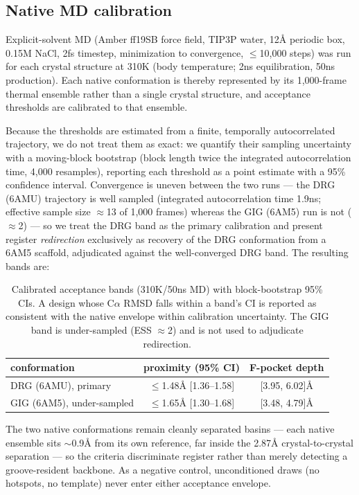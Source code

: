 \documentclass[letterpaper]{article}
\begin{document}
\subsection{Native MD calibration}

Explicit-solvent MD (Amber ff19SB force field, TIP3P water, 12\AA{} periodic box, 0.15M NaCl, 2fs
timestep, minimization to convergence, $\leq$10,000 steps) was run for each crystal structure at 310K
(body temperature; 2ns equilibration, 50ns production). Each native conformation is thereby represented by
its 1,000-frame thermal ensemble rather than a single crystal structure, and acceptance thresholds are
calibrated to that ensemble.

Because the thresholds are estimated from a finite, temporally autocorrelated trajectory, we do not treat
them as exact: we quantify their sampling uncertainty with a moving-block bootstrap (block length twice the
integrated autocorrelation time, 4{,}000 resamples), reporting each threshold as a point estimate with a
95\% confidence interval. Convergence is uneven between the two runs --- the DRG (6AMU) trajectory is well
sampled (integrated autocorrelation time 1.9ns; effective sample size $\approx$13 of 1{,}000 frames)
whereas the GIG (6AM5) run is not ($\approx$2) --- so we treat the DRG band as the primary calibration and
present register \emph{redirection} exclusively as recovery of the DRG conformation from a 6AM5 scaffold,
adjudicated against the well-converged DRG band. The resulting bands are:

\begin{table}[t]
\centering
\small
\begin{tabular}{lcc}
\toprule
conformation & proximity (95\% CI) & F-pocket depth \\
\midrule
DRG (6AMU), primary & $\leq$1.48\AA{} [1.36--1.58] & [3.95, 6.02]\AA{} \\
GIG (6AM5), under-sampled & $\leq$1.65\AA{} [1.30--1.68] & [3.48, 4.79]\AA{} \\
\bottomrule
\end{tabular}
\caption{Calibrated acceptance bands (310K/50ns MD) with block-bootstrap 95\% CIs. A design whose
C$\alpha$ RMSD falls within a band's CI is reported as consistent with the native envelope within
calibration uncertainty. The GIG band is under-sampled (ESS $\approx$2) and is not used to adjudicate
redirection.}
\label{tab:bands}
\end{table}

The two native conformations remain cleanly separated basins --- each native ensemble sits $\sim$0.9\AA{}
from its own reference, far inside the 2.87\AA{} crystal-to-crystal separation --- so the criteria
discriminate register rather than merely detecting a groove-resident backbone. As a negative control,
unconditioned draws (no hotspots, no template) never enter either acceptance envelope.
\end{document}
